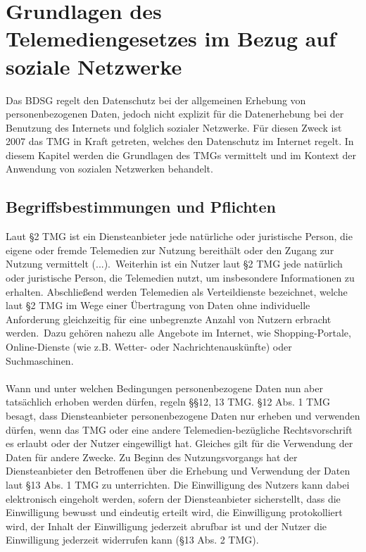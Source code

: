 \chapter{Grundlagen des Telemediengesetzes im Bezug auf soziale Netzwerke}
Das BDSG regelt den Datenschutz bei der allgemeinen Erhebung von personenbezogenen Daten, jedoch nicht explizit für die Datenerhebung bei der Benutzung des Internets und folglich sozialer Netzwerke. Für diesen Zweck ist 2007 das \ac{TMG} in Kraft getreten, welches den Datenschutz im Internet regelt.\autocite[vgl.][]{klicksafe.de} \autocite[vgl.][]{shr.de} In diesem Kapitel werden die Grundlagen des TMGs vermittelt und im Kontext der Anwendung von sozialen Netzwerken behandelt.
\section{Begriffsbestimmungen und Pflichten}
Laut \S 2 TMG ist ein Diensteanbieter \glqq jede natürliche oder juristische Person, die eigene oder fremde Telemedien zur Nutzung bereithält oder den Zugang zur Nutzung vermittelt (...).\grqq \ Weiterhin ist ein Nutzer laut \S 2 TMG jede natürlich oder juristische Person, die Telemedien nutzt, um insbesondere Informationen zu erhalten. Abschließend werden Telemedien als Verteildienste bezeichnet, welche laut \S 2 TMG \glqq im Wege einer Übertragung von Daten ohne individuelle Anforderung gleichzeitig für eine unbegrenzte Anzahl von Nutzern erbracht werden.\grqq \ Dazu gehören nahezu alle Angebote im Internet, wie Shopping-Portale, Online-Dienste (wie z.B. Wetter- oder Nachrichtenauskünfte) oder Suchmaschinen.\autocite[vgl.][]{shr.de}\\
\\Wann und unter welchen Bedingungen personenbezogene Daten nun aber tatsächlich erhoben werden dürfen, regeln \S\S 12, 13 TMG.  \S 12 Abs. 1 TMG besagt, dass Diensteanbieter personenbezogene Daten nur erheben und verwenden dürfen, wenn das TMG oder eine andere Telemedien-bezügliche Rechtsvorschrift es erlaubt oder der Nutzer eingewilligt hat. Gleiches gilt für die Verwendung der Daten für andere Zwecke. Zu Beginn des Nutzungsvorgangs hat der Diensteanbieter den Betroffenen über die Erhebung und Verwendung der Daten laut \S 13 Abs. 1 TMG zu unterrichten. Die Einwilligung des Nutzers kann dabei elektronisch eingeholt werden, sofern der Diensteanbieter sicherstellt, dass die Einwilligung bewusst und eindeutig erteilt wird, die Einwilligung protokolliert wird, der Inhalt der Einwilligung jederzeit abrufbar ist und der Nutzer die Einwilligung jederzeit widerrufen kann (\S 13 Abs. 2 TMG).
